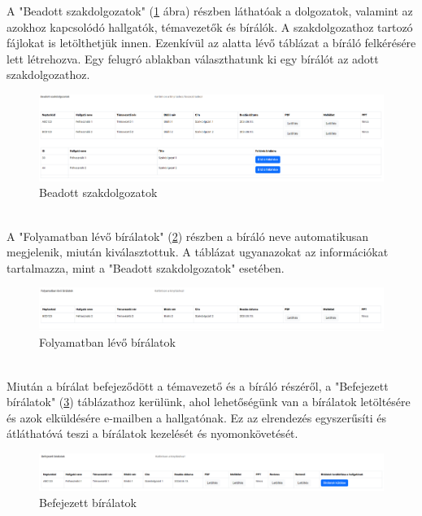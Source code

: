 A "Beadott szakdolgozatok" (\ref{fig:Report_status1} ábra) részben láthatóak a dolgozatok, valamint az azokhoz kapcsolódó hallgatók, témavezetők és bírálók. A szakdolgozathoz tartozó fájlokat is letölthetjük innen. Ezenkívül az alatta lévő táblázat a bíráló felkérésére lett létrehozva. Egy felugró ablakban választhatunk ki egy bírálót az adott szakdolgozathoz.\\
\begin{figure}[h!]
\centering
\includegraphics[width=\textwidth]{images/Report_status1.png}
\caption{Beadott szakdolgozatok}
\label{fig:Report_status1}
\end{figure}
\\A "Folyamatban lévő bírálatok" (\ref{fig:Report_status2}) részben a bíráló neve automatikusan megjelenik, miután kiválasztottuk. A táblázat ugyanazokat az információkat tartalmazza, mint a "Beadott szakdolgozatok" esetében.\\
\begin{figure}[h!]
\centering
\includegraphics[width=\textwidth]{images/Report_status2.png}
\caption{Folyamatban lévő bírálatok}
\label{fig:Report_status2}
\end{figure}
\\Miután a bírálat befejeződött a témavezető és a bíráló részéről, a "Befejezett bírálatok" (\ref{fig:Report_status3}) táblázathoz kerülünk, ahol lehetőségünk van a bírálatok letöltésére és azok elküldésére e-mailben a hallgatónak. Ez az elrendezés egyszerűsíti és átláthatóvá teszi a bírálatok kezelését és nyomonkövetését.
\begin{figure}[h!]
\centering
\includegraphics[width=\textwidth]{images/Report_status3.png}
\caption{Befejezett bírálatok}
\label{fig:Report_status3}
\end{figure}

